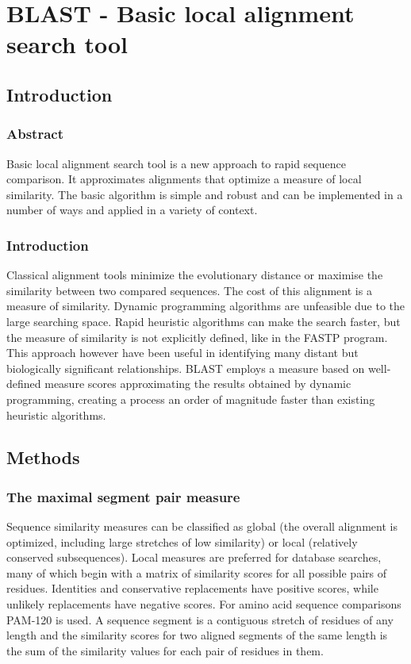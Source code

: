 \graphicspath{{chapters/06/images}}
\chapter{BLAST - Basic local alignment search tool}

\section{Introduction}

	\subsection{Abstract}
	Basic local alignment search tool is a new approach to rapid sequence comparison.
	It approximates alignments that optimize a measure of local similarity.
	The basic algorithm is simple and robust and can be implemented in a number of ways and applied in a variety of context.

	\subsection{Introduction}
	Classical alignment tools minimize the evolutionary distance or maximise the similarity between two compared sequences.
	The cost of this alignment is a measure of similarity.
	Dynamic programming algorithms are unfeasible due to the large searching space.
	Rapid heuristic algorithms can make the search faster, but the measure of similarity is not explicitly defined, like in the FASTP program.
	This approach however have been useful in identifying many distant but biologically significant relationships.
	BLAST employs a measure based on well-defined measure scores approximating the results obtained by dynamic programming, creating a process an order of magnitude faster than existing heuristic algorithms.

\section{Methods}

	\subsection{The maximal segment pair measure}
	Sequence similarity measures can be classified as global (the overall alignment is optimized, including large stretches of low similarity) or local (relatively conserved subsequences).
	Local measures are preferred for database searches, many of which begin with a matrix of similarity scores for all possible pairs of residues.
	Identities and conservative replacements have positive scores, while unlikely replacements have negative scores.
	For amino acid sequence comparisons PAM-120 is used.
	A sequence segment is a contiguous stretch of residues of any length and the similarity scores for two aligned segments of the same length is the sum of the similarity values for each pair of residues in them.

